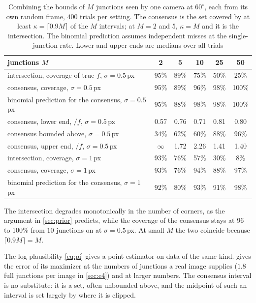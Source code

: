 \begin{table}[t]
\centering\small
\caption{Combining the bounds of $M$ junctions seen by one camera at $60^\circ$, each from its own random frame, $400$ trials per setting. The consensus is the set covered by at least $\kappa=\lceil0.9M\rceil$ of the $M$ intervals; at $M=2$ and $5$, $\kappa=M$ and it is the intersection. The binomial prediction assumes independent misses at the single-junction rate. Lower and upper ends are medians over all trials}
\label{tab:combine}
\begin{tabular}{lccccc}
\toprule
junctions $M$ & 2 & 5 & 10 & 25 & 50\\
\midrule
intersection, coverage of true $f$, $\sigma=0.5$\,px & 95\% & 89\% & 75\% & 50\% & 25\%\\
consensus, coverage, $\sigma=0.5$\,px & 95\% & 89\% & 96\% & 98\% & 100\%\\
binomial prediction for the consensus, $\sigma=0.5$\,px & 95\% & 88\% & 98\% & 98\% & 100\%\\
consensus, lower end, $/f$, $\sigma=0.5$\,px & 0.57 & 0.76 & 0.71 & 0.81 & 0.80\\
consensus bounded above, $\sigma=0.5$\,px & 34\% & 62\% & 60\% & 88\% & 96\%\\
consensus, upper end, $/f$, $\sigma=0.5$\,px & $\infty$ & 1.72 & 2.26 & 1.41 & 1.40\\
intersection, coverage, $\sigma=1$\,px & 93\% & 76\% & 57\% & 30\% & 8\%\\
consensus, coverage, $\sigma=1$\,px & 93\% & 76\% & 94\% & 88\% & 97\%\\
binomial prediction for the consensus, $\sigma=1$\,px & 92\% & 80\% & 93\% & 91\% & 98\%\\
\bottomrule
\end{tabular}
\end{table}

The intersection degrades monotonically in the number of corners, as the argument in \cref{sec:prior} predicts, while the coverage of the consensus stays at 96 to 100\% from $10$ junctions on at $\sigma=0.5$\,px. At small $M$ the two coincide because $\lceil 0.9M\rceil=M$.

 The log-plausibility \eqref{eq:pi} gives a point estimator on data of the same kind.  gives the error of its maximizer at the numbers of junctions a real image supplies ($1.8$ full junctions per image in \cref{sec:e4}) and at larger numbers. The consensus interval is no substitute: it is a set, often unbounded above, and the midpoint of such an interval is set largely by where it is clipped.

